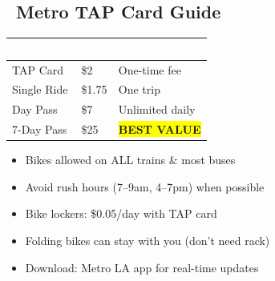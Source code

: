 \documentclass[10pt,letterpaper]{article}
\begin{document}
\begin{center}
\end{center}

\subsection*{\faTrain\ Metro TAP Card Guide}

\begin{small}
\begin{tabularx}{\textwidth}{|l|l|X|}
\hline
\rowcolor{primary!80}\textcolor{white}{\textbf{Pass Type}} & \textcolor{white}{\textbf{Cost}} & \textcolor{white}{\textbf{Best For}} \\
\hline
TAP Card & \$2 & One-time fee \\
\hline
Single Ride & \$1.75 & One trip \\
\hline
Day Pass & \$7 & Unlimited daily \\
\hline
7-Day Pass & \$25 & \colorbox{yellow}{\textbf{BEST VALUE}} \\
\hline
\end{tabularx}
\end{small}

\begin{tipbox}[title=\faLightbulb\ Metro + Bike Tips:]
\begin{small}
\begin{itemize}[leftmargin=0.2in,itemsep=1pt]
\item Bikes allowed on ALL trains \& most buses
\item Avoid rush hours (7--9am, 4--7pm) when possible
\item Bike lockers: \$0.05/day with TAP card
\item Folding bikes can stay with you (don't need rack)
\item Download: Metro LA app for real-time updates
\end{itemize}
\end{small}
\end{tipbox}
\end{document}
